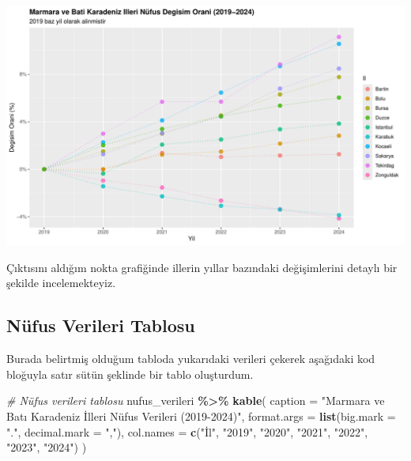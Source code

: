 \documentclass[
]{article}
\newenvironment{Shaded}{\begin{snugshade}}{\end{snugshade}}
\newcommand{\AttributeTok}[1]{\textcolor[rgb]{0.13,0.29,0.53}{#1}}
\newcommand{\CommentTok}[1]{\textcolor[rgb]{0.56,0.35,0.01}{\textit{#1}}}
\newcommand{\FunctionTok}[1]{\textcolor[rgb]{0.13,0.29,0.53}{\textbf{#1}}}
\newcommand{\NormalTok}[1]{#1}
\newcommand{\SpecialCharTok}[1]{\textcolor[rgb]{0.81,0.36,0.00}{\textbf{#1}}}
\newcommand{\StringTok}[1]{\textcolor[rgb]{0.31,0.60,0.02}{#1}}
\begin{document}
\includegraphics{cigdem_ucar_Rmarkdown_odevi_files/figure-latex/yuzdesel-degisim-1.pdf}

Çıktısını aldığım nokta grafiğinde illerin yıllar bazındaki
değişimlerini detaylı bir şekilde incelemekteyiz.

\subsection{Nüfus Verileri Tablosu}\label{nuxfcfus-verileri-tablosu}

Burada belirtmiş olduğum tabloda yukarıdaki verileri çekerek aşağıdaki
kod bloğuyla satır sütün şeklinde bir tablo oluşturdum.

\begin{Shaded}
\begin{Highlighting}[]
\CommentTok{\# Nüfus verileri tablosu}
\NormalTok{nufus\_verileri }\SpecialCharTok{\%\textgreater{}\%}
  \FunctionTok{kable}\NormalTok{(}
    \AttributeTok{caption =} \StringTok{"Marmara ve Batı Karadeniz İlleri Nüfus Verileri (2019{-}2024)"}\NormalTok{,}
    \AttributeTok{format.args =} \FunctionTok{list}\NormalTok{(}\AttributeTok{big.mark =} \StringTok{"."}\NormalTok{, }\AttributeTok{decimal.mark =} \StringTok{","}\NormalTok{),}
    \AttributeTok{col.names =} \FunctionTok{c}\NormalTok{(}\StringTok{"İl"}\NormalTok{, }\StringTok{"2019"}\NormalTok{, }\StringTok{"2020"}\NormalTok{, }\StringTok{"2021"}\NormalTok{, }\StringTok{"2022"}\NormalTok{, }\StringTok{"2023"}\NormalTok{, }\StringTok{"2024"}\NormalTok{)}
\NormalTok{  )}
\end{Highlighting}
\end{Shaded}
\end{document}
